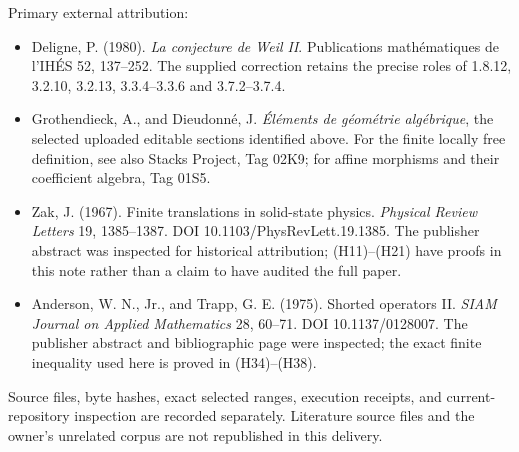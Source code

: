 Primary external attribution:

\begin{itemize}
\tightlist
\item
  Deligne, P. (1980). \emph{La conjecture de Weil II}. Publications mathématiques de l'IHÉS 52, 137--252. The supplied correction retains the precise roles of 1.8.12, 3.2.10, 3.2.13, 3.3.4--3.3.6 and 3.7.2--3.7.4.
\item
  Grothendieck, A., and Dieudonné, J. \emph{Éléments de géométrie algébrique}, the selected uploaded editable sections identified above. For the finite locally free definition, see also Stacks Project, Tag 02K9; for affine morphisms and their coefficient algebra, Tag 01S5.
\item
  Zak, J. (1967). Finite translations in solid-state physics. \emph{Physical Review Letters} 19, 1385--1387. DOI 10.1103/PhysRevLett.19.1385. The publisher abstract was inspected for historical attribution; (H11)--(H21) have proofs in this note rather than a claim to have audited the full paper.
\item
  Anderson, W. N., Jr., and Trapp, G. E. (1975). Shorted operators II. \emph{SIAM Journal on Applied Mathematics} 28, 60--71. DOI 10.1137/0128007. The publisher abstract and bibliographic page were inspected; the exact finite inequality used here is proved in (H34)--(H38).
\end{itemize}

Source files, byte hashes, exact selected ranges, execution receipts, and current-repository inspection are recorded separately. Literature source files and the owner's unrelated corpus are not republished in this delivery.
